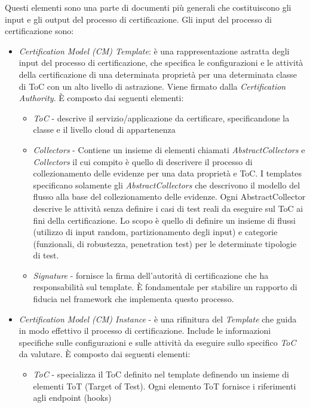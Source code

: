 \documentclass[../main.tex]{subfiles}
\begin{document}
Questi elementi sono una parte di documenti più generali che costituiscono gli input e gli output del processo di certificazione.
Gli input del  processo di certificazione sono:\cite{TrustModelCloudAnisDamArd}
\begin{itemize}
\item \textit{Certification Model (CM) Template}: è una rappresentazione astratta degli input del processo di certificazione, che specifica le configurazioni e le attività della certificazione di una determinata proprietà per una determinata classe di ToC con un alto livello di astrazione. Viene firmato dalla \textit{Certification Authority}.
\`E composto dai seguenti elementi:
\begin{itemize}
\item \textit{ToC} - descrive il servizio/applicazione da certificare, specificandone la classe e il livello cloud di appartenenza
\item \textit{Collectors} - Contiene un insieme di elementi chiamati \textit{AbstractCollectors} e \textit{Collectors} il cui compito è quello di descrivere il processo di collezionamento delle evidenze per una data proprietà e ToC.
I templates specificano solamente gli \textit{AbstractCollectors} che descrivono il modello del flusso alla base del collezionamento delle evidenze. Ogni AbstractCollector descrive le attività senza definire i casi di test reali da eseguire sul ToC ai fini della certificazione. Lo scopo è quello di definire un insieme di flussi (utilizzo di input random, partizionamento degli input) e categorie (funzionali, di robustezza, penetration test) per le determinate tipologie di test.
\item \textit{Signature} - fornisce la firma dell'autorità di certificazione che ha responsabilità sul template. \`E fondamentale per stabilire un rapporto di fiducia nel framework che implementa questo processo.
\end{itemize}
\item \textit{Certification Model (CM) Instance} - è una rifinitura del \textit{Template} che guida in modo effettivo il processo di certificazione. Include le informazioni specifiche sulle configurazioni e sulle attività da eseguire sullo specifico \textit{ToC} da valutare.
\`E composto dai seguenti elementi:
\begin{itemize}
\item \textit{ToC} - specializza il ToC definito nel template definendo
un insieme di elementi ToT (Target of Test). Ogni elemento
ToT fornisce i riferimenti agli endpoint (hooks)

\end{itemize}
\end{itemize}
\end{document}
